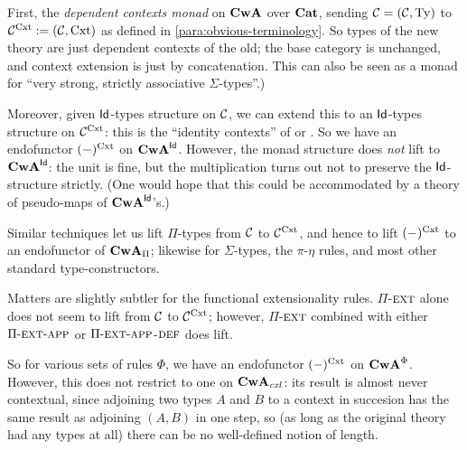 \begin{para} First, the \emph{dependent contexts monad} on $\mathbf{CwA}$ over $\mathbf{Cat}$, sending $\mathcal{C} = (\mathcal{C},\mathrm{Ty})$ to $\mathcal{C}^{\mathrm{Cxt}} := (\mathcal{C},\mathrm{Cxt})$ as defined in \ref{para:obvious-terminology}.  So types of the new theory are just dependent contexts of the old; the base category is unchanged, and context extension is just by concatenation.  This can also be seen as a monad for ``very strong, strictly associative $\Sigma$-types''.)  

Moreover, given $\mathsf{Id}$-types structure on $\mathcal{C}$, we can extend this to an $\mathsf{Id}$-types structure on $\mathcal{C}^{\mathrm{Cxt}}$: this is the ``identity contexts'' of \cite{streicher:hab} or \cite{gambino-garner}.   So we have an endofunctor $(-)^{\mathrm{Cxt}}$ on $\mathbf{CwA}^{\mathsf{Id}}$. However, the monad structure does \emph{not} lift to $\mathbf{CwA}^{\mathsf{Id}}$: the unit is fine, but the multiplication turns out not to preserve the $\mathsf{Id}$-structure strictly.  (One would hope that this could be accommodated by a theory of pseudo-maps of $\mathbf{CwA}^{\mathsf{Id}}$'s.)

Similar techniques let us lift $\Pi$-types from $\mathcal{C}$ to $\mathcal{C}^{\mathrm{Cxt}}$, and hence to lift $(-)^{\mathrm{Cxt}}$ to an endofunctor of $\mathbf{CwA}_\Pi$; likewise for $\Sigma$-types, the $\pi$-$\eta$ rules, and most other standard type-constructors.

Matters are slightly subtler for the functional extensionality rules.   $\Pi$-$\textsc{ext}$ alone does not seem to lift from $\mathcal{C}$ to $\mathcal{C}^{\mathrm{Cxt}}$; however, $\Pi$-$\textsc{ext}$ combined with either ${\Pi\mbox{-}\textsc{ext}\mbox{-}\textsc{app}}$ or ${\Pi\mbox{-}\textsc{ext}\mbox{-}\textsc{app}}$-$\textsc{def}$ does lift.

So for various sets of rules $\Phi$, we have an endofunctor $(-)^{\mathrm{Cxt}}$ on $\mathbf{CwA}^\Phi$.  However, this does not restrict to one on $\mathbf{CwA}_{\mathit{cxl}}$: its result is almost never contextual, since adjoining two types $A$ and $B$ to a context in succesion has the same result as adjoining $(A,B)$ in one step, so (as long as the original theory had any types at all) there can be no well-defined notion of length.
\end{para}

